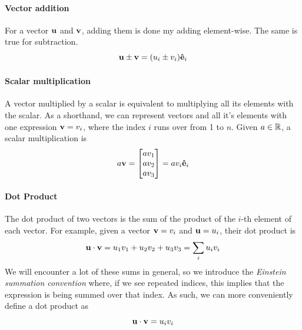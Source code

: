 			\paragraph{Vector addition}
				For a vector $\vb u$ and $\vb v$, adding them is done my adding element-wise. The same is true for subtraction.
				\begin{equation}
					\vb{u} \pm \vb{v} = (u_i \pm v_i)\vu{e}_i
				\end{equation}
            \paragraph{Scalar multiplication}
                A vector multiplied by a scalar is equivalent to multiplying all its elements with the scalar. As a shorthand, we can represent vectors and all it's elements with one expression $\vb{v}=v_i$, where the index $i$ runs over from 1 to $n$. Given $a\in\mathbb{R}$, a scalar multiplication is
                \begin{equation}
					a\vb{v}=\mqty[a v_1\\av_2\\av_3]=av_i\vu{e}_i
                \end{equation}

            \paragraph{Dot Product}
                The dot product of two vectors is the sum of the product of the $i$-th element of each vector. For example, given a vector $\vb{v}=v_i$ and $\vb{u}=u_i$, their dot product is
                \begin{equation}
                    \vb{u}\cdot\vb{v} = 
                    u_1v_1 + u_2v_2+u_3v_3 = \sum_i u_i v_i
                \end{equation}
                We will encounter a lot of these sums in general, so we introduce the \textit{Einstein summation convention} where, if we see repeated indices, this implies that the expression is being summed over that index. As such, we can more conveniently define a dot product as 
                \begin{equation}
                    \vb{u}\cdot\vb{v} = u_i v_i
                \end{equation}
